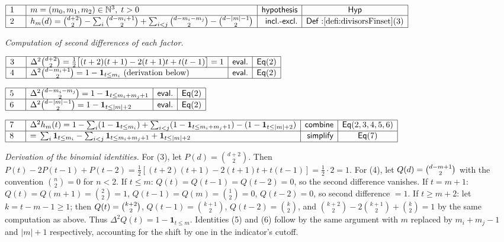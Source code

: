 \documentclass[11pt,reqno]{amsart}
\providecommand{\N}{\mathbb{N}}
\begin{document}
\noindent$%
\begin{array}{|m{0.5cm}|l|r|c|}
\hline
1 & m=(m_{0},m_{1},m_{2})\in\N^{3},\;t>0 & \mathsf{hypothesis} & \mathsf{Hyp}
\\ \hline
2 & h_{m}(d)=\binom{d+2}{2}-\sum_{i}\binom{d-m_{i}+1}{2}+\sum_{i<j}\binom{%
d-m_{i}-m_{j}}{2}-\binom{d-|m|-1}{2} & \mathsf{incl.\text{-}excl.} & \mathsf{%
Def:}\ref{defi:divisorsFinset}(3) \\ \hline
\end{array}%
$

\nointerlineskip\noindent\textit{Computation of second differences of each
factor.}

\nointerlineskip\noindent$%
\begin{array}{|m{0.5cm}|l|r|c|}
\hline
3 & \Delta^{2}\binom{d+2}{2}=\tfrac{1}{2}\bigl[(t+2)(t+1)-2(t+1)t+t(t-1)%
\bigr]=1 & \mathsf{eval.} & \mathsf{Eq}(2) \\ \hline
4 & \Delta^{2}\binom{d-m_{i}+1}{2}=1-\mathbf{1}_{t\le m_{i}}\ \text{%
(derivation below)} & \mathsf{eval.} & \mathsf{Eq}(2) \\ \hline
\end{array}%
$

\nointerlineskip\noindent$%
\begin{array}{|m{0.5cm}|l|r|c|}
\hline
5 & \Delta^{2}\binom{d-m_{i}-m_{j}}{2}=1-\mathbf{1}_{t\le m_{i}+m_{j}+1} & 
\mathsf{eval.} & \mathsf{Eq}(2) \\ \hline
6 & \Delta^{2}\binom{d-|m|-1}{2}=1-\mathbf{1}_{t\le|m|+2} & \mathsf{eval.} & 
\mathsf{Eq}(2) \\ \hline
\end{array}%
$

\nointerlineskip\noindent$%
\begin{array}{|m{0.5cm}|l|r|c|}
\hline
7 & \Delta^{2}h_{m}(t)=1-\sum_{i}(1-\mathbf{1}_{t\le m_{i}})+\sum_{i<j}(1-%
\mathbf{1}_{t\le m_{i}+m_{j}+1})-(1-\mathbf{1}_{t\le|m|+2}) & \mathsf{combine%
} & \mathsf{Eq}(2,3,4,5,6) \\ \hline
8 & =\,\sum_{i}\mathbf{1}_{t\le m_{i}}-\sum_{i<j}\mathbf{1}_{t\le
m_{i}+m_{j}+1}+\mathbf{1}_{t\le|m|+2} & \mathsf{simplify} & \mathsf{Eq}(7)
\\ \hline
\end{array}%
$

\medskip \noindent\textit{Derivation of the binomial identities.} For (3),
let $P(d)=\binom{d+2}{2}$. Then $P(t)-2P(t-1)+P(t-2)=\frac{1}{2}%
[(t+2)(t+1)-2(t+1)t+t(t-1)]=\frac{1}{2}\cdot 2=1$. For (4), let $Q(d)=\binom{%
d-m+1}{2}$ with the convention $\binom{n}{2}=0$ for $n<2$. If $t\le m$: $%
Q(t)=Q(t-1)=Q(t-2)=0$, so the second difference vanishes. If $t=m+1$: $%
Q(t)=Q(m+1)=\binom{2}{2}=1$, $Q(t-1)=Q(m)=\binom{1}{2}=0$, $Q(t-2)=0$, so
second difference $=1$. If $t\ge m+2$: let $k=t-m-1\ge1$; then $Q(t)=\binom{%
k+2}{2}$, $Q(t-1)=\binom{k+1}{2}$, $Q(t-2)=\binom{k}{2}$, and $\binom{k+2}{2}%
-2\binom{k+1}{2}+\binom{k}{2}=1$ by the same computation as above. Thus $%
\Delta^{2}Q(t)=1-\mathbf{1}_{t\le m}$. Identities (5) and (6) follow by the
same argument with $m$ replaced by $m_{i}+m_{j}-1$ and $|m|+1$ respectively,
accounting for the shift by one in the indicator's cutoff.
\end{document}
